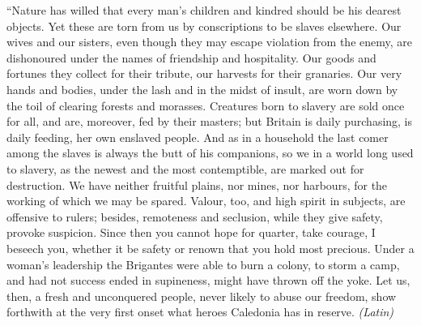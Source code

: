 
``Nature has willed that every man's children and kindred should be his dearest objects. Yet these are torn from us by conscriptions to be slaves elsewhere. Our wives and our sisters, even though they may escape violation from the enemy, are dishonoured under the names of friendship and hospitality. Our goods and fortunes they collect for their tribute, our harvests for their granaries. Our very hands and bodies, under the lash and in the midst of insult, are worn down by the toil of clearing forests and morasses. Creatures born to slavery are sold once for all, and are, moreover, fed by their masters; but Britain is daily purchasing, is daily feeding, her own enslaved people. And as in a household the last comer among the slaves is always the butt of his companions, so we in a world long used to slavery, as the newest and the most contemptible, are marked out for destruction. We have neither fruitful plains, nor mines, nor harbours, for the working of which we may be spared. Valour, too, and high spirit in subjects, are offensive to rulers; besides, remoteness and seclusion, while they give safety, provoke suspicion. Since then you cannot hope for quarter, take courage, I beseech you, whether it be safety or renown that you hold most precious. Under a woman's leadership the Brigantes were able to burn a colony, to storm a camp, and had not success ended in supineness, might have thrown off the yoke. Let us, then, a fresh and unconquered people, never likely to abuse our freedom, show forthwith at the very first onset what heroes Caledonia has in reserve. \emph{(Latin)}


